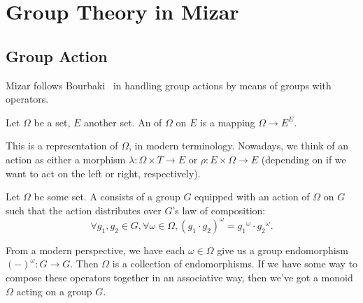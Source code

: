\chapter{Group Theory in Mizar}












\section{Group Action}

Mizar follows Bourbaki~\cite{bourbaki1974elements} in handling group
actions by means of groups with operators.

\begin{definition}
Let $\Omega$ be a set, $E$ another set. An  of $\Omega$
on $E$ is a mapping $\Omega\to E^{E}$.
\end{definition}

This is a representation of $\Omega$, in modern terminology. Nowadays,
we think of an action as either a morphism $\lambda\colon\Omega\times T\to E$
or $\rho\colon E\times\Omega\to E$ (depending on if we want to act on
the left or right, respectively).

\begin{definition}
Let $\Omega$ be some set. A 
consists of a group $G$ equipped with an action of $\Omega$ on $G$ such
that the action distributes over $G$'s law of composition:
\begin{equation}
  \forall g_{1},g_{2}\in G,\forall\omega\in\Omega,
  (g_{1}\cdot g_{2})^{\omega} = {g_{1}}^{\omega}\cdot{g_{2}}^{\omega}.
\end{equation}
\end{definition}

\begin{def-remark}
From a modern perspective, we have each $\omega\in\Omega$ give us a
group endomorphism $(-)^{\omega}\colon G\to G$. Then $\Omega$ is a
collection of endomorphisms. If we have some way to compose these
operators together in an associative way, then we've got a monoid
$\Omega$ acting on a group $G$.
\end{def-remark}

